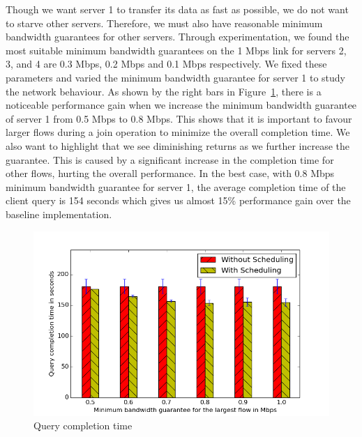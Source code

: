 \documentclass{sig-alternate-2013}
\begin{document}
Though we want server 1 to transfer its data as fast as possible, we do not want to starve other servers.
Therefore, we must also have reasonable minimum bandwidth guarantees for other servers.
Through experimentation, we found the most suitable minimum bandwidth guarantees on the 1 Mbps link for servers 2, 3, and 4 are 0.3 Mbps, 0.2 Mbps and 0.1 Mbps respectively.
We fixed these parameters and varied the minimum bandwidth guarantee for server 1 to study the network behaviour.
As shown by the right bars in Figure~\ref{fig:micro_benchmark_total_time}, there is a noticeable performance gain when we increase the minimum bandwidth guarantee of server 1 from 0.5 Mbps to 0.8 Mbps.
This shows that it is important to favour larger flows during a join operation to minimize the overall completion time.
We also want to highlight that we see diminishing returns as we further increase the guarantee.
This is caused by a significant increase in the completion time for other flows, hurting the overall performance.
In the best case, with 0.8 Mbps minimum bandwidth guarantee for server 1, the average completion time of the client query is 154 seconds which gives us almost 15\% performance gain over the baseline implementation.

\begin{figure}
    \centering
    \includegraphics[scale=0.47]{figures/simple_topo_overall.png}
    \caption{Query completion time}\label{fig:micro_benchmark_total_time}
\end{figure}
\end{document}
